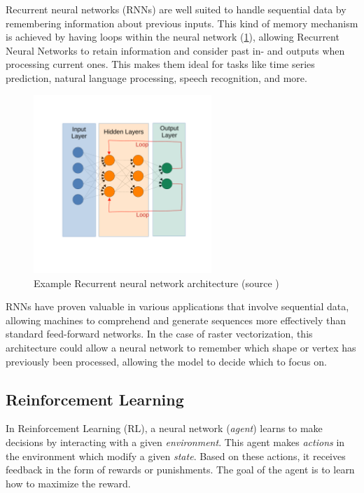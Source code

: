 \documentclass[12pt, a4paper, titlepage]{report}
\begin{document}
Recurrent neural networks (RNNs) are well suited to handle sequential data by remembering information about previous inputs. This kind of memory mechanism is achieved by having loops within the neural network (\ref{fig:rnn_architecture}), allowing Recurrent Neural Networks to retain information and consider past in- and outputs when processing current ones. This makes them ideal for tasks like time series prediction, natural language processing, speech recognition, and more.

\begin{figure}[h]
   \centering
	\includegraphics[width=0.6\textwidth]{../rc/images/rnn_architecture.pdf}
   \caption{Example Recurrent neural network architecture (source \cite{img_rnn_architecture})}
	\label{fig:rnn_architecture}
\end{figure}

RNNs have proven valuable in various applications that involve sequential data, allowing machines to comprehend and generate sequences more effectively than standard feed-forward networks. In the case of raster vectorization, this architecture could allow a neural network to remember which shape or vertex has previously been processed, allowing the model to decide which to focus on.

\subsection{Reinforcement Learning}

In Reinforcement Learning (RL), a neural network (\emph{agent}) learns to make decisions by interacting with a given \emph{environment}. This agent makes \emph{actions} in the environment which modify a given \emph{state}. Based on these actions, it receives feedback in the form of rewards or punishments. The goal of the agent is to learn how to maximize the reward.
\end{document}
